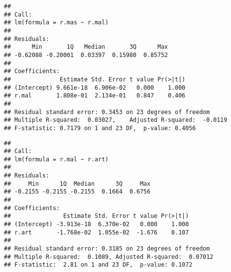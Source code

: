 \documentclass[]{article}
\newenvironment{Shaded}{\begin{snugshade}}{\end{snugshade}}
\newcommand{\KeywordTok}[1]{\textcolor[rgb]{0.13,0.29,0.53}{\textbf{#1}}}
\newcommand{\StringTok}[1]{\textcolor[rgb]{0.31,0.60,0.02}{#1}}
\newcommand{\CommentTok}[1]{\textcolor[rgb]{0.56,0.35,0.01}{\textit{#1}}}
\newcommand{\OperatorTok}[1]{\textcolor[rgb]{0.81,0.36,0.00}{\textbf{#1}}}
\newcommand{\NormalTok}[1]{#1}
\begin{document}
\begin{Shaded}
\end{Shaded}

\begin{verbatim}
## 
## Call:
## lm(formula = r.mas ~ r.mal)
## 
## Residuals:
##      Min       1Q   Median       3Q      Max 
## -0.62088 -0.20001  0.03397  0.15980  0.85752 
## 
## Coefficients:
##              Estimate Std. Error t value Pr(>|t|)
## (Intercept) 9.661e-18  6.906e-02   0.000    1.000
## r.mal       1.808e-01  2.134e-01   0.847    0.406
## 
## Residual standard error: 0.3453 on 23 degrees of freedom
## Multiple R-squared:  0.03027,    Adjusted R-squared:  -0.0119 
## F-statistic: 0.7179 on 1 and 23 DF,  p-value: 0.4056
\end{verbatim}

\begin{Shaded}
\end{Shaded}

\begin{verbatim}
## 
## Call:
## lm(formula = r.mal ~ r.art)
## 
## Residuals:
##     Min      1Q  Median      3Q     Max 
## -0.2155 -0.2155 -0.2155  0.1664  0.6756 
## 
## Coefficients:
##               Estimate Std. Error t value Pr(>|t|)
## (Intercept) -3.913e-18  6.370e-02   0.000    1.000
## r.art       -1.768e-02  1.055e-02  -1.676    0.107
## 
## Residual standard error: 0.3185 on 23 degrees of freedom
## Multiple R-squared:  0.1089, Adjusted R-squared:  0.07012 
## F-statistic:  2.81 on 1 and 23 DF,  p-value: 0.1072
\end{verbatim}
\end{document}

